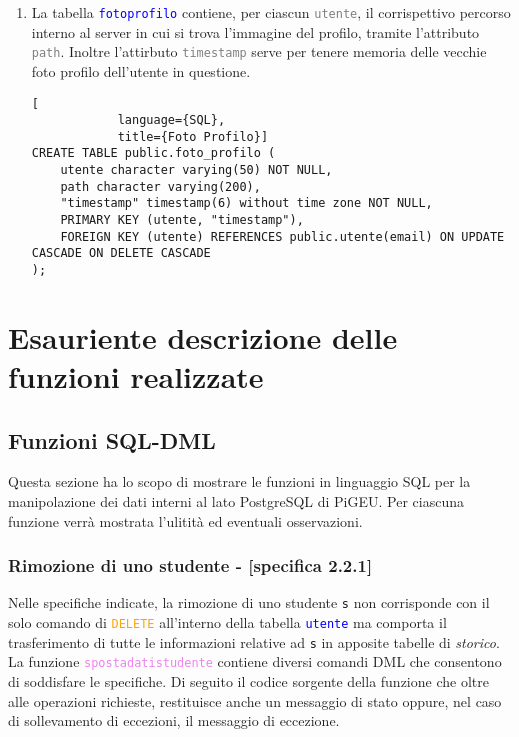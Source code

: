 \documentclass{article}
\newcommand{\tabb}[1]{\texttt{\textcolor{blue}{#1}}}
\newcommand{\attr}[1]{\texttt{\textcolor{gray}{#1}}}
\newcommand{\sqlcommand}[1]{\texttt{\textcolor{orange}{#1}}}
\newcommand{\sqlfunc}[1]{\texttt{\textcolor{violet}{#1}}}
\newcommand{\und}[0]{\textunderscore}
\begin{document}
\begin{enumerate}
        \item La tabella \tabb{foto\und profilo} contiene, per ciascun \attr{utente}, il corrispettivo percorso interno al server in cui si trova l'immagine del profilo, tramite l'attributo \attr{path}. Inoltre l'attirbuto \attr{timestamp} serve per tenere memoria delle vecchie foto profilo dell'utente in questione.
        \begin{lstlisting}[
            language={SQL},
            title={Foto Profilo}]
CREATE TABLE public.foto_profilo (
    utente character varying(50) NOT NULL,
    path character varying(200),
    "timestamp" timestamp(6) without time zone NOT NULL,
    PRIMARY KEY (utente, "timestamp"),
    FOREIGN KEY (utente) REFERENCES public.utente(email) ON UPDATE CASCADE ON DELETE CASCADE
);
        \end{lstlisting}
    \end{enumerate}

    \section{Esauriente descrizione delle funzioni realizzate}
    \subsection{Funzioni SQL-DML}
    Questa sezione ha lo scopo di mostrare le funzioni in linguaggio SQL per la manipolazione dei dati interni al lato PostgreSQL di PiGEU. Per ciascuna funzione verrà mostrata l'ulitità ed eventuali osservazioni.
    \subsubsection{Rimozione di uno studente - [specifica 2.2.1]}
    Nelle specifiche indicate, la rimozione di uno studente \texttt{s} non corrisponde con il solo comando di \sqlcommand{DELETE} all'interno della tabella \tabb{utente} ma comporta il trasferimento di tutte le informazioni relative ad \texttt{s} in apposite tabelle di \textit{storico}. La funzione \sqlfunc{sposta\und dati\und studente} contiene diversi comandi DML che consentono di soddisfare le specifiche. Di seguito il codice sorgente della funzione che oltre alle operazioni richieste, restituisce anche un messaggio di stato oppure, nel caso di sollevamento di eccezioni, il messaggio di eccezione.
\end{document}
